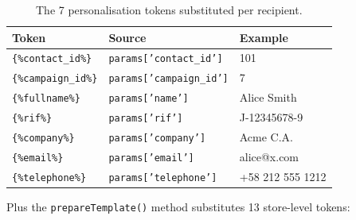 \documentclass[11pt,a4paper]{article}
\begin{document}
\begin{table}[htbp]
\centering
\caption{The 7 personalisation tokens substituted per recipient.}\label{tab:personalisation}
\small
\begin{tabularx}{\columnwidth}{llX}
\toprule
\textbf{Token} & \textbf{Source} & \textbf{Example} \\
\midrule
\texttt{\{\%contact\_id\%\}}    & \texttt{params['contact\_id']}    & 101 \\
\texttt{\{\%campaign\_id\%\}}   & \texttt{params['campaign\_id']}   & 7 \\
\texttt{\{\%fullname\%\}}       & \texttt{params['name']}           & Alice Smith \\
\texttt{\{\%rif\%\}}            & \texttt{params['rif']}            & J-12345678-9 \\
\texttt{\{\%company\%\}}        & \texttt{params['company']}        & Acme C.A. \\
\texttt{\{\%email\%\}}          & \texttt{params['email']}          & alice@x.com \\
\texttt{\{\%telephone\%\}}      & \texttt{params['telephone']}      & +58 212 555 1212 \\
\bottomrule
\end{tabularx}
\end{table}

Plus the \texttt{prepareTemplate()} method substitutes 13
store-level tokens:
\end{document}
